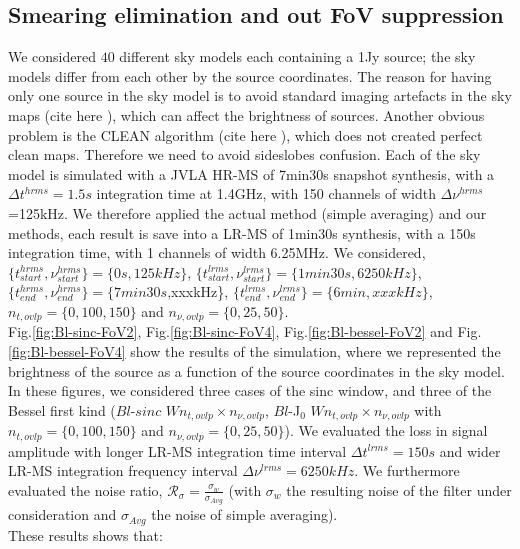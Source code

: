 \documentclass[useAMS,usenatbib]{mn2e}
\begin{document}
\subsection{Smearing elimination and out FoV suppression}
We considered $40$ different sky models each  containing a 1Jy source; the sky models differ from each other by the source coordinates. 
The reason for having  only one source in the sky model is to avoid standard imaging artefacts in the sky maps (cite here \cite{2}), which 
can affect the brightness of sources. Another obvious problem is the  CLEAN algorithm (cite here \cite{2}), which does not created 
perfect clean maps. Therefore we need to avoid sideslobes confusion. Each of the sky model is simulated 
with a JVLA HR-MS of 7min30s snapshot synthesis, with a $\Delta t^{hrms}=1.5s$ integration 
time at 1.4GHz,  with 150 channels of width $\Delta \nu^{hrms}$=125kHz. We therefore applied the actual method (simple averaging) and 
our methods, each result is save into a LR-MS of 1min30s synthesis, with a 150s integration time,  with 1 channels of width 6.25MHz. We 
considered, $\{t^{hrms}_{start},\nu^{hrms}_{start}\}=\{0s,125kHz\}$, $\{t^{lrms}_{start},\nu^{lrms}_{start}\}=\{1min30s,6250kHz\}$, 
$\{t^{hrms}_{end},\nu^{hrms}_{end}\}=\{7min30s$,xxxkHz\}, $\{t^{lrms}_{end},\nu^{lrms}_{end}\}=\{6min,xxxkHz\}$, $n_{t,ovlp}=\{0,100,150\}$ 
and $n_{\nu,ovlp}=\{0,25,50\}$.\\
Fig.\ref{fig:Bl-sinc-FoV2}, Fig.\ref{fig:Bl-sinc-FoV4}, Fig.\ref{fig:Bl-bessel-FoV2} and Fig.\ref{fig:Bl-bessel-FoV4} show the results of 
the simulation, where we represented the brightness of the source as a function of the source coordinates in the sky model. In these 
figures, we 
considered three cases of the sinc window, and three of the Bessel first kind ($Bl$-$sinc$ $W n_{t,ovlp} \times n_{\nu,ovlp}$, $Bl$-J$_0$ 
$W n_{t,ovlp} \times n_{\nu,ovlp}$ with  $n_{t,ovlp}=\{0,100,150\}$ and $n_{\nu,ovlp}=\{0,25,50\}$). We evaluated the loss in signal 
amplitude with longer LR-MS integration time interval $\Delta t^{lrms}=150s$ and wider LR-MS integration frequency interval $\Delta 
\nu^{lrms}=6250kHz$. We furthermore evaluated the  noise ratio, $\mathcal{R}_{\sigma}=\frac{\sigma_{w}}{\sigma_{Avg}}$ (with $\sigma_{w}$  
the resulting noise of the filter under consideration and $\sigma_{Avg}$ the noise of simple averaging).\\
These results shows that:
\end{document}
